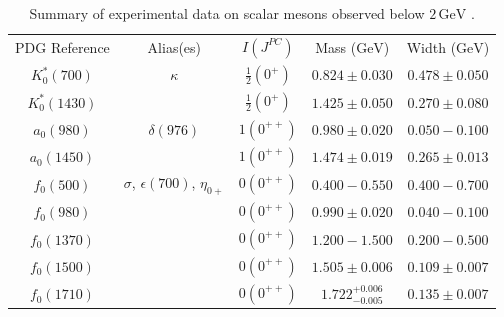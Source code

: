 \documentclass[aps,prd,onecolumn,showpacs,amsmath,amssymb,nofootinbib]{revtex4} \pdfoutput=1
\newcommand{\gev}{\mathrm{GeV}}
\begin{document}
\begin{table}[!htb]
\begin{tabular}{|c|c|c|c|c|}
\hline

PDG Reference   & Alias(es) & $I(J^{PC})$     & Mass ($\gev$) & Width ($\gev$) \\ 
$K^{*}_0(700)$  & $\kappa$  & $\frac{1}{2}(0^{+})$ &  $0.824\pm0.030$  &    $0.478\pm0.050$            \\
$K^{*}_0(1430)$ &           & $\frac{1}{2}(0^{+})$ & $1.425\pm0.050$ & $0.270\pm0.080$             \\ 
$a_0(980)$      &     $\delta(976)$      & $1(0^{++})$           & $0.980\pm0.020$ & $0.050-0.100$               \\ 
$a_0(1450)$     &           & $1(0^{++})$           & $1.474\pm0.019$ & $0.265\pm0.013$             \\ 
$f_0(500)$      & $\sigma$, $\epsilon(700)$, $\eta_{0+}$  & $0(0^{++})$     & $0.400 - 0.550$ & $0.400 - 0.700$               \\ 
$f_0(980)$      &           & $0(0^{++})$           & $0.990\pm0.020$ & $0.040-0.100$               \\ 
$f_0(1370)$     &           & $0(0^{++})$           & $1.200-1.500$   & $0.200-0.500$               \\
$f_0(1500)$     &           & $0(0^{++})$           & $1.505\pm0.006$ & $0.109\pm0.007$             \\ 
$f_0(1710)$     &           & $0(0^{++})$           & $1.722^{+0.006}_{-0.005}$ & $0.135\pm0.007$               \\ \hline
\end{tabular}
\caption{Summary of experimental data on scalar mesons observed below $2\,\gev$ \cite{PDG2018}.}
\label{table:scalars}
\end{table}

\end{document}
